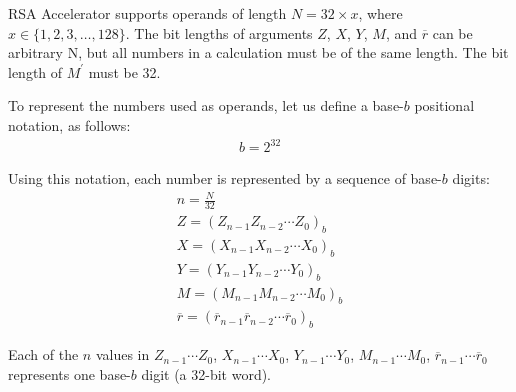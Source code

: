 \documentclass[main\_\_EN.tex]{subfiles}
\begin{document}
RSA Accelerator supports operands of length \begin{math}N = 32 \times x\end{math}, where \begin{math}x \in \{ 1,2,3, \dots, 128\} \end{math}. The bit lengths of arguments \begin{math}Z\end{math}, \begin{math}X\end{math}, \begin{math}Y\end{math}, \begin{math}M\end{math}, and \begin{math}\overline{r}\end{math}
can be arbitrary N, but all numbers in a calculation must be of the same length. The bit length of \begin{math}M^{\prime}\end{math} must be 32.

To represent the numbers used as operands, let us define a base-\begin{math}b\end{math} positional notation, as follows:
\begin{gather*}
    b = 2^{32}
\end{gather*}

Using this notation, each number is represented by a sequence of base-\begin{math}b\end{math} digits:
\begin{gather*}
    n = \frac{N}{32} \\
    Z = ( Z_{n-1} Z_{n-2} \cdots Z_{0} )_{b} \\
    X = ( X_{n-1} X_{n-2} \cdots X_{0} )_{b} \\
    Y = ( Y_{n-1} Y_{n-2} \cdots Y_{0} )_{b} \\
    M = ( M_{n-1} M_{n-2} \cdots M_{0} )_{b} \\
    \overline{r} = ( \overline{r}_{n-1} \overline{r}_{n-2} \cdots \overline{r}_{0} )_{b}
\end{gather*}

Each of the \begin{math}n\end{math} values in
\begin{math}Z_{n-1} \cdots Z_{0}\end{math},
\begin{math}X_{n-1} \cdots X_{0}\end{math},
\begin{math}Y_{n-1} \cdots Y_{0}\end{math},
\begin{math}M_{n-1} \cdots M_{0}\end{math},
\begin{math}\overline{r}_{n-1}\cdots \overline{r}_{0}\end{math} represents one base-\begin{math}b\end{math} digit (a 32-bit word).
\end{document}
